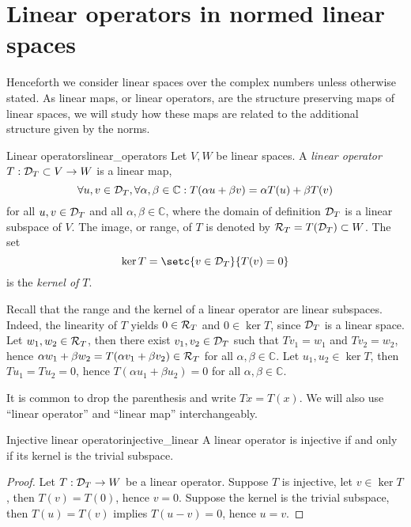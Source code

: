 \section{Linear operators in normed linear spaces}
Henceforth we consider linear spaces over the complex numbers unless otherwise stated. As linear maps, or linear operators, are the structure preserving maps of linear spaces, we will study how these maps are related to the additional structure given by the norms.
\begin{definition}{Linear operators}{linear_operators}
    Let \(V, W\) be linear spaces. A \emph{linear operator} \(T : \mathcal{D}_{T} \subset V \to W\) is a linear map,
    \begin{equation*}
        \forall u, v \in \domain{T}, \forall \alpha, \beta \in \mathbb{C}: %
        T(\alpha u + \beta v) = \alpha T(u) + \beta T(v)
    \end{equation*}
    for all \(u,v \in \mathcal{D}_{T}\) and all \(\alpha, \beta \in \mathbb{C}\), where the domain of definition \(\mathcal{D}_{T}\) is a linear subspace of \(V\). The image, or range, of \(T\) is denoted by \(\mathcal{R}_{T} = T(\mathcal{D}_{T}) \subset W\). The set
    \begin{equation*}
        \ker{T} = \setc{v \in \domain{T}}{T(v) = 0}
    \end{equation*}
    is the \emph{kernel of \(T\)}.
\end{definition}
\begin{remark}
    Recall that the range and the kernel of a linear operator are linear subspaces. Indeed, the linearity of \(T\) yields \(0 \in \mathcal{R}_{T}\) and \(0 \in \ker{T}\), since \(\mathcal{D}_{T}\) is a linear space. Let \(w_1, w_2 \in \mathcal{R}_{T}\), then there exist \(v_1, v_2 \in \mathcal{D}_{T}\) such that \(Tv_1 = w_1\) and \(Tv_2 = w_2\), hence \(\alpha w_1 + \beta w_2 = T(\alpha v_1 + \beta v_2) \in \mathcal{R}_{T}\) for all \(\alpha, \beta \in \mathbb{C}\). Let \(u_1, u_2 \in \ker{T}\), then \(Tu_1 = Tu_2 = 0\), hence \(T(\alpha u_1 + \beta u_2) = 0\) for all \(\alpha, \beta \in \mathbb{C}\).
\end{remark}
\begin{remark}
    It is common to drop the parenthesis and write \(Tx = T(x)\). We will also use \enquote{linear operator} and \enquote{linear map} interchangeably.
\end{remark}

\begin{proposition}{Injective linear operator}{injective_linear}
    A linear operator is injective if and only if its kernel is the trivial subspace.
\end{proposition}
\begin{proof}
    Let \(T : \mathcal{D}_{T} \to W\) be a linear operator. Suppose \(T\) is injective, let \(v \in \ker{T}\), then \(T(v) = T(0)\), hence \(v = 0\). Suppose the kernel is the trivial subspace, then \(T(u) = T(v)\) implies \(T(u - v) = 0\), hence \(u = v\).
\end{proof}

